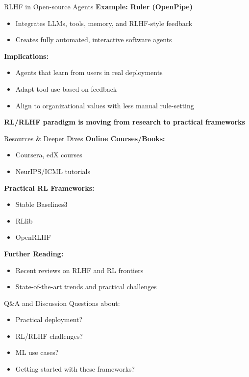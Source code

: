 \documentclass[aspectratio=169]{beamer}
\begin{document}
\begin{frame}{RLHF in Open-source Agents}
  \textbf{Example: Ruler (OpenPipe)}
  \begin{itemize}
    \item Integrates LLMs, tools, memory, and RLHF-style feedback
    \item Creates fully automated, interactive software agents
  \end{itemize}

  \vspace{0.5cm}
  \textbf{Implications:}
  \begin{itemize}
    \item Agents that learn from users in real deployments
    \item Adapt tool use based on feedback
    \item Align to organizational values with less manual rule-setting
  \end{itemize}

  \vspace{0.5cm}
  \centering
  \textbf{RL/RLHF paradigm is moving from research to practical frameworks}
\end{frame}

\begin{frame}{Resources \& Deeper Dives}
  \textbf{Online Courses/Books:}
  \begin{itemize}
    \item Coursera, edX courses
    \item NeurIPS/ICML tutorials
  \end{itemize}

  \vspace{0.3cm}
  \textbf{Practical RL Frameworks:}
  \begin{itemize}
    \item Stable Baselines3
    \item RLlib
    \item OpenRLHF
  \end{itemize}

  \vspace{0.3cm}
  \textbf{Further Reading:}
  \begin{itemize}
    \item Recent reviews on RLHF and RL frontiers
    \item State-of-the-art trends and practical challenges
  \end{itemize}
\end{frame}

\begin{frame}{Q\&A and Discussion}
  \centering
  \Large
  Questions about:
  \begin{itemize}
    \item Practical deployment?
    \item RL/RLHF challenges?
    \item ML use cases?
    \item Getting started with these frameworks?
  \end{itemize}
\end{frame}
\end{document}
